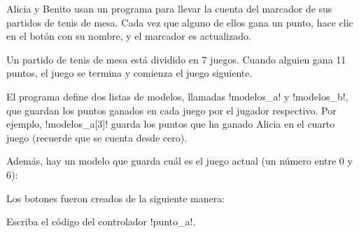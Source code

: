 Alicia y Benito usan un programa para llevar la cuenta
del marcador de sus partidos de tenis de mesa.
Cada vez que alguno de ellos gana un punto,
hace clic en el botón con su nombre,
y el marcador es actualizado.

Un partido de tenis de mesa está dividido en 7 juegos.
Cuando alguien gana 11 puntos,
el juego se termina y comienza el juego siguiente.


El programa define dos listas de modelos,
llamadas \li!modelos_a! y \li!modelos_b!,
que guardan los puntos ganados en cada juego
por el jugador respectivo.
Por ejemplo, \li!modelos_a[3]! guarda los puntos
que ha ganado Alicia en el cuarto juego
(recuerde que se cuenta desde cero).

Además,
hay un modelo que guarda cuál es el juego actual
(un número entre 0 y 6):


Los botones fueron creados de la siguiente manera:


Escriba el código del controlador \li!punto_a!.

